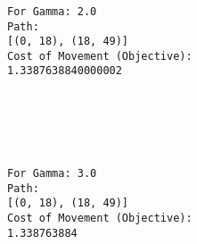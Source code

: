 \documentclass[11pt]{article}
\begin{document}
    \begin{center}
    \end{center}
    { \hspace*{\fill} \\}
    
    \begin{center}
    \end{center}
    { \hspace*{\fill} \\}
    
    \begin{Verbatim}[commandchars=\\\{\}]

For Gamma: 2.0
Path:
[(0, 18), (18, 49)]
Cost of Movement (Objective):
1.3387638840000002

    \end{Verbatim}

    \begin{center}
    \end{center}
    { \hspace*{\fill} \\}
    
    \begin{center}
    \end{center}
    { \hspace*{\fill} \\}
    
    \begin{Verbatim}[commandchars=\\\{\}]

For Gamma: 3.0
Path:
[(0, 18), (18, 49)]
Cost of Movement (Objective):
1.338763884

    \end{Verbatim}

    \begin{center}
    \end{center}
    { \hspace*{\fill} \\}
    
    \begin{center}
    \end{center}
    { \hspace*{\fill} \\}
    
\end{document}

